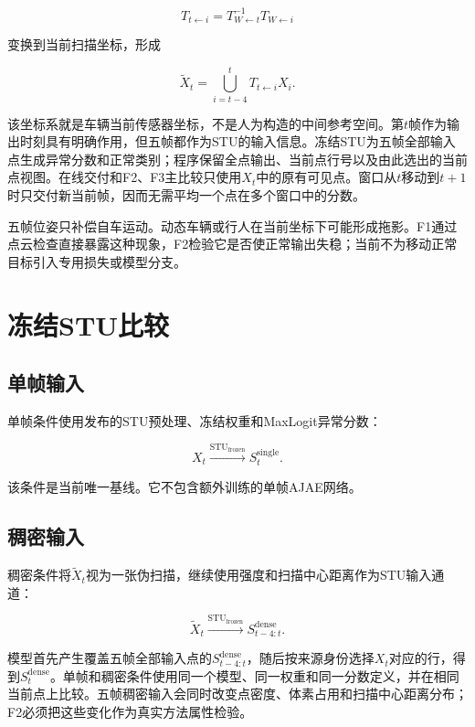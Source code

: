 \documentclass[UTF8,a4paper,zihao=5,fontset=none]{ctexart}
\begin{document}
\begin{equation}
T_{t\leftarrow i}=T_{W\leftarrow t}^{-1}T_{W\leftarrow i}
\end{equation}

变换到当前扫描坐标，形成

\begin{equation}
\widetilde X_t=\bigcup_{i=t-4}^{t}T_{t\leftarrow i}X_i.
\end{equation}

该坐标系就是车辆当前传感器坐标，不是人为构造的中间参考空间。第$t$帧作为输出时刻具有明确作用，但五帧都作为STU的输入信息。冻结STU为五帧全部输入点生成异常分数和正常类别；程序保留全点输出、当前点行号以及由此选出的当前点视图。在线交付和F2、F3主比较只使用$X_t$中的原有可见点。窗口从$t$移动到$t+1$时只交付新当前帧，因而无需平均一个点在多个窗口中的分数。

五帧位姿只补偿自车运动。动态车辆或行人在当前坐标下可能形成拖影。F1通过点云检查直接暴露这种现象，F2检验它是否使正常输出失稳；当前不为移动正常目标引入专用损失或模型分支。

\section{冻结STU比较}

\subsection{单帧输入}

单帧条件使用发布的STU预处理、冻结权重和MaxLogit异常分数：

\begin{equation}
X_t\xrightarrow{\operatorname{STU}_{\mathrm{frozen}}}S_t^{\mathrm{single}}.
\end{equation}

该条件是当前唯一基线。它不包含额外训练的单帧AJAE网络。

\subsection{稠密输入}

稠密条件将$\widetilde X_t$视为一张伪扫描，继续使用强度和扫描中心距离作为STU输入通道：

\begin{equation}
\widetilde X_t\xrightarrow{\operatorname{STU}_{\mathrm{frozen}}}S_{t-4:t}^{\mathrm{dense}}.
\end{equation}

模型首先产生覆盖五帧全部输入点的$S_{t-4:t}^{\mathrm{dense}}$，随后按来源身份选择$X_t$对应的行，得到$S_t^{\mathrm{dense}}$。单帧和稠密条件使用同一个模型、同一权重和同一分数定义，并在相同当前点上比较。五帧稠密输入会同时改变点密度、体素占用和扫描中心距离分布；F2必须把这些变化作为真实方法属性检验。
\end{document}
